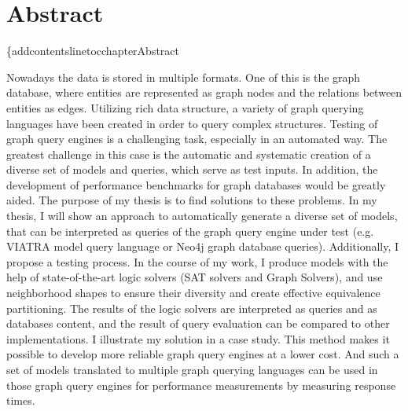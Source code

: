 \chapter*{Abstract}\{\tiny addcontentsline{toc}{chapter}{Abstract}

Nowadays the data is stored in multiple formats. One of this is the graph database, where entities are represented as graph nodes and the relations between entities as edges. Utilizing rich data structure, a variety of graph querying languages have been created in order to query complex structures.
Testing of graph query engines is a challenging task, especially in an automated way. The greatest challenge in this case is the automatic and systematic creation of a diverse set of models and queries, which serve as test inputs. In addition, the development of performance benchmarks for graph databases would be greatly aided.
The purpose of my thesis is to find solutions to these problems.  In my thesis, I will show an approach to automatically generate a diverse set of models, that can be interpreted as queries of the graph query engine under test (e.g. VIATRA model query language or Neo4j graph database queries). Additionally, I propose a testing process.
In the course of my work, I produce models with the help of state-of-the-art logic solvers (SAT solvers and Graph Solvers), and use neighborhood shapes to ensure their diversity and create effective equivalence partitioning. The results of the logic solvers are interpreted as queries and as databases content, and the result of query evaluation can be compared to other implementations. I illustrate my solution in a case study.
This method makes it possible to develop more reliable graph query engines at a lower cost. And such a set of models translated to multiple graph querying languages can be used in those graph query engines for performance measurements by measuring response times.


\vfill
\selectthesislanguage

\setcounter{romanPage}{\value{page}}
